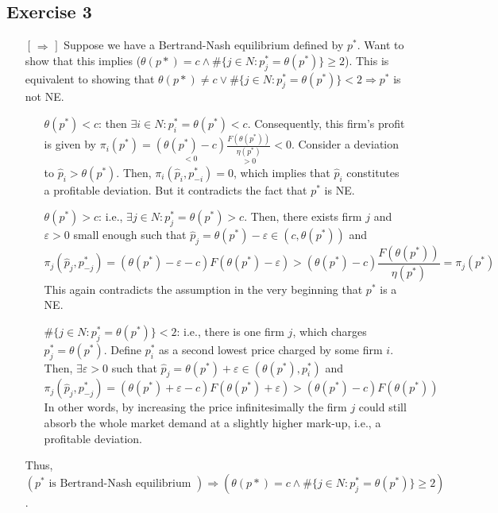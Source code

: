 \documentclass[]{article}
\begin{document}
\subsection*{Exercise 3}

\begin{itemize}
	\item[$\begin{bmatrix}\Rightarrow\end{bmatrix}$] Suppose we have a Bertrand-Nash equilibrium defined by $p^*$. Want to show that this implies ($\theta(p*) = c \wedge \#\{j\in N: p_j^* = \theta(p^*)\}\geq2$). This is equivalent to showing that $\theta(p*) \neq c \vee \#\{j\in N: p_j^* = \theta(p^*)\}<2 \Longrightarrow p^*$ is not NE.
	\begin{itemize}
		\item[] $\theta(p^*) < c$: then $\exists i\in N: p_i^* = \theta(p^*) < c$. Consequently, this firm's profit is given by $\pi_i(p^*) = \underset{<0}{(\theta(p^*) - c)}\underset{>0}{\frac{F(\theta(p^*))}{\eta(p^*)}} < 0$. Consider a deviation to $\hat{p}_i > \theta(p^*)$. Then, $\pi_i(\hat{p}_i, p_{-i}^*) = 0$, which implies that $\hat{p}_i$ constitutes a profitable deviation. But it contradicts the fact that $p^*$ is NE.
		
		\item[] $\theta(p^*) > c$: i.e., $\exists j\in N: p_j^* = \theta(p^*) > c$. Then, there exists firm $j$ and $\varepsilon > 0$ small enough such that $\hat{p}_j = \theta(p^*) - \varepsilon\in(c, \theta(p^*))$ and
		\begin{equation}
			\pi_j(\hat{p}_j, p_{-j}^*) = (\theta(p^*) - \varepsilon - c)F(\theta(p^*) - \varepsilon) > (\theta(p^*) - c)\frac{F(\theta(p^*))}{\eta(p^*)} = \pi_j(p^*) \nonumber
		\end{equation}
		This again contradicts the assumption in the very beginning that $p^*$ is a NE.
		\item[]$\#\{j\in N: p_j^* = \theta(p^*)\}<2$: i.e., there is one firm $j$, which charges $p_j^* = \theta(p^*)$. Define $p_i^*$ as a second lowest price charged by some firm $i$. Then, $\exists\varepsilon>0$ such that $\hat{p}_j = \theta(p^*) + \varepsilon \in (\theta(p^*), p_i^*)$ and
		\begin{equation}
			\pi_j(\hat{p}_j, p_{-j}^*) = (\theta(p^*) + \varepsilon - c)F(\theta(p^*) + \varepsilon) > (\theta(p^*) - c)F(\theta(p^*)) \nonumber
		\end{equation}
		In other words, by increasing the price infinitesimally the firm $j$ could still absorb the whole market demand at a slightly higher mark-up, i.e., a profitable deviation. \Lightning
	\end{itemize}
	Thus, $(p^* \text{ is Bertrand-Nash equilibrium }) \Longrightarrow (\theta(p*) = c \wedge \#\{j\in N: p_j^* = \theta(p^*)\}\geq2)$.
	

\end{itemize}
\end{document}
